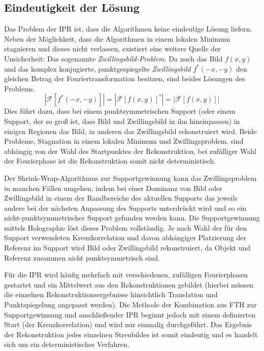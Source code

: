 \subsection{Eindeutigkeit der Lösung}
Das Problem der IPR ist, dass die Algorithmen keine eindeutige Lösung liefern. Neben der Möglichkeit, dass die Algorithmen in einem lokalen Minimum stagnieren und dieses nicht verlassen, existiert eine weitere Quelle der Unsicherheit: Das sogenannte \textit{Zwillingsbild-Problem}. Da nach  das Bild $f(x,y)$ und das komplex konjugierte, punktgespiegelte \textit{Zwillingsbild}  $f^*(-x,-y)$ den gleichen Betrag der Fouriertransformation besitzen, sind beides Lösungen des Problems.
\begin{equation}
	\label{eq:zwilling}
	\left|\mathscr{F}[f^*(-x,-y)]\right|=\left|\mathscr{F}[f(x,y)]^*\right|=\left|\mathscr{F}[f(x,y)]\right|
\end{equation}
Dies führt dazu, dass bei einem punktsymmetrischen Support (oder einem Support, der so groß ist, dass Bild und Zwillingsbild in ihn hineinpassen) in einigen Regionen das Bild, in anderen das Zwillingsbild rekonstruiert wird. Beide Probleme, Stagnation in einem lokalen Minimum und Zwillingsproblem, sind abhängig von der Wahl des Startpunktes der Rekonstruktion, bei zufälliger Wahl der Fourierphase ist die Rekonstruktion somit nicht deterministisch.

Der Shrink-Wrap-Algorithmus zur Supportgewinnung kann das Zwillingsproblem in manchen Fällen umgehen, indem bei einer Dominanz von Bild oder Zwillingsbild in einem der Randbereiche des aktuellen Supports das jeweils andere bei der nächsten Anpassung des Supports unterdrückt wird und so ein nicht-punktsymmetrischer Support gefunden werden kann.
Die Supportgewinnung mittels Holographie löst dieses Problem vollständig. Je nach Wahl der für den Support verwendeten Kreuzkorrelation und davon abhängiger Platzierung der Referenz im Support wird Bild oder Zwillingsbild rekonstruiert, da Objekt und Referenz zusammen nicht punktsymmetrisch sind.

Für die IPR wird häufig mehrfach mit verschiedenen, zufälligen Fourierphasen gestartet und ein Mittelwert aus den Rekonstruktionen gebildet (hierbei müssen die einzelnen Rekonstruktionsergebnisse hinsichtlich Translation und Punktspiegelung angepasst werden). Die Methode der Kombination aus FTH zur Supportgewinnung und anschließender IPR beginnt jedoch mit einem definierten Start (der Kreuzkorrelation) und wird nur einmalig durchgeführt. Das Ergebnis der Rekonstruktion jedes einzelnen Streubildes ist somit eindeutig und es handelt sich um ein deterministisches Verfahren.

